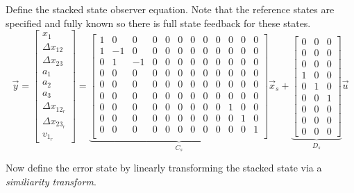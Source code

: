 \documentclass[12pt,onecolumn,reqno]{amsart}
\begin{document}
Define the stacked state observer equation. Note that the reference states are
specified and fully known so there is full state feedback for these states.
\begin{equation}
  \vec{y} = 
  \begin{bmatrix}
    x_{1}             \\
    \Delta x_{12}     \\
    \Delta x_{23}     \\
    a_{1}             \\
    a_{2}             \\
    a_{3}             \\
    \Delta x_{12_{r}} \\
    \Delta x_{23_{r}} \\
    v_{1_{r}}
  \end{bmatrix}
  =
  \underbrace{
  \begin{bmatrix}
    1 & 0 & 0 & 0 & 0 & 0 & 0 & 0 & 0 & 0 & 0 & 0 \\
    1 & -1 & 0 & 0 & 0 & 0 & 0 & 0 & 0 & 0 & 0 & 0 \\
    0 & 1 & -1 & 0 & 0 & 0 & 0 & 0 & 0 & 0 & 0 & 0 \\
    0 & 0 & 0 & 0 & 0 & 0 & 0 & 0 & 0 & 0 & 0 & 0 \\
    0 & 0 & 0 & 0 & 0 & 0 & 0 & 0 & 0 & 0 & 0 & 0 \\
    0 & 0 & 0 & 0 & 0 & 0 & 0 & 0 & 0 & 0 & 0 & 0 \\
    0 & 0 & 0 & 0 & 0 & 0 & 0 & 0 & 0 & 1 & 0 & 0 \\
    0 & 0 & 0 & 0 & 0 & 0 & 0 & 0 & 0 & 0 & 1 & 0 \\
    0 & 0 & 0 & 0 & 0 & 0 & 0 & 0 & 0 & 0 & 0 & 1 \\
  \end{bmatrix}
  }_{C_{s}}
  \vec{x}_{s}
  +
  \underbrace{
  \begin{bmatrix}
    0 & 0 & 0 \\
    0 & 0 & 0 \\
    0 & 0 & 0 \\
    1 & 0 & 0 \\
    0 & 1 & 0 \\
    0 & 0 & 1 \\
    0 & 0 & 0 \\
    0 & 0 & 0 \\
    0 & 0 & 0
  \end{bmatrix}
  }_{D_{s}}
  \vec{u}
\end{equation}

Now define the error state by linearly transforming the stacked state via a
\textit{similiarity transform}.
\end{document}
